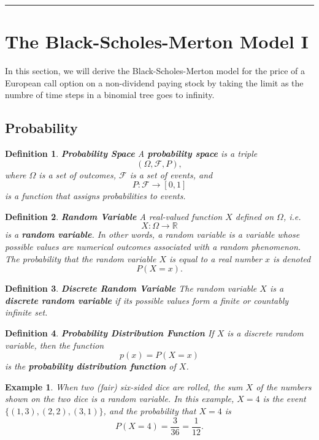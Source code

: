 \documentclass[letterpaper,10pt]{article}
\newtheorem{df}{Definition}[section]
\newtheorem{exa}{Example}[section]
\begin{document}
\bigskip

\hrule

\bigskip


\newpage

\section{The Black-Scholes-Merton Model I}

\noindent In this section, we will derive the Black-Scholes-Merton model for the price of a European call option on a non-dividend paying stock by taking the limit as the numbre of time steps in a binomial tree goes to infinity.

\subsection{Probability}

\begin{df}{\bf Probability Space}
A {\bf probability space} is a triple $$(\Omega,\mathcal{F},P),$$ where $\Omega$ is a set of outcomes, $\mathcal{F}$ is a set of events, and $$P:\mathcal{F}\rightarrow[0,1]$$ is a function that assigns probabilities to events.   
\end{df}

\begin{df}{\bf Random Variable}
A real-valued function $X$ defined on $\Omega$, i.e. $$X:\Omega\rightarrow\mathbb{R}$$ is a {\bf random variable}.  In other words, a random variable is a variable whose possible values are numerical outcomes associated with a random phenomenon.  The probability that the random variable $X$ is equal to a real number $x$ is denoted $$P(X=x).$$  
\end{df}

\begin{df}{\bf Discrete Random Variable}
The random variable $X$ is a {\bf discrete random variable} if its possible values
form a finite or countably infinite set.
\end{df}

\begin{df}{\bf Probability Distribution Function}
If $X$ is a discrete random variable, then the function $$p(x)=P(X=x)$$ is the {\bf probability distribution function} of $X$.
\end{df}



\begin{exa} When two (fair) six-sided dice are rolled, the sum $X$ of the numbers shown on the two dice is a random variable.  In this example, $X=4$ is the event $\displaystyle \{(1,3),(2,2),(3,1)\}$, and the probability that $X=4$ is $$P(X=4)=\frac{3}{36}=\frac{1}{12}.$$ 
\end{exa}
\end{document}
